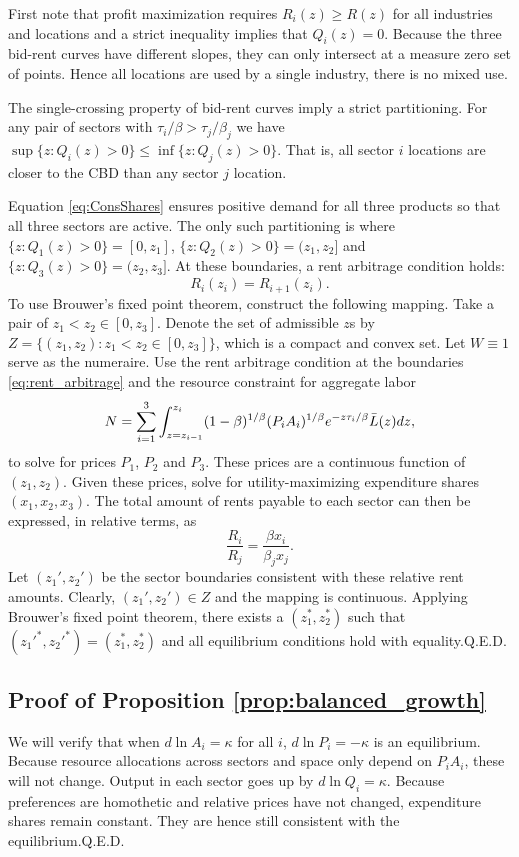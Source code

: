 \documentclass[12pt]{article}
\begin{document}
First note that profit maximization requires $R_i(z)\ge R(z)$ for all industries and locations and a strict inequality implies that $Q_i(z)=0$. Because the three bid-rent curves have different slopes, they can only intersect at a measure zero set of points. Hence all locations are used by a single industry, there is no mixed use.

The single-crossing property of bid-rent curves imply a strict partitioning. For any pair of sectors with $\tau_i/\beta>\tau_j/\beta_j$ we have $\sup\{z: Q_i(z)>0\} \le \inf\{z: Q_j(z)>0\}$. That is, all sector $i$ locations are closer to the CBD than any sector $j$ location.

Equation \eqref{eq:ConsShares} ensures positive demand for all three products so that all three sectors are active. The only such partitioning is where $\{z: Q_1(z)>0\} = [0,z_1]$, $\{z: Q_2(z)>0\} = (z_1,z_2]$ and $\{z: Q_3(z)>0\} = (z_2,z_3]$. At these boundaries, a rent arbitrage condition holds:
\begin{equation}\label{eq:rent_arbitrage}
	R_i(z_i) = R_{i+1}(z_i).
\end{equation}
To use Brouwer's fixed point theorem, construct the following mapping. Take a pair of $z_1<z_2 \in [0,z_3]$. Denote the set of admissible $z$s by $Z=\{(z_1,z_2): z_1<z_2 \in [0,z_3]\}$, which is a compact and convex set. Let $W\equiv 1$ serve as the numeraire. Use the rent arbitrage condition at the boundaries \eqref{eq:rent_arbitrage} and the resource constraint for aggregate labor
\[
N = \sum_{i=1}^3 \int_{z=z_{i-1}}^{z_i}(1-\beta)^{1/\beta}
	(P_iA_i)^{1/\beta}
	e^{- z \tau_i/\beta}\Bar L(z)dz,
\]
to solve for prices $P_1$, $P_2$ and $P_3$. These prices are a continuous function of $(z_1,z_2)$.
Given these prices, solve for utility-maximizing expenditure shares $(x_1,x_2,x_3)$. The total amount of rents payable to each sector can then be expressed, in relative terms, as
\[
\frac {R_i}
	{R_j}
=
\frac {\beta x_i}
	{\beta_j x_j}.
\]
Let $(z_1',z_2')$ be the sector boundaries consistent with these relative rent amounts. Clearly, $(z_1',z_2')\in Z$ and the mapping is continuous. Applying Brouwer's fixed point theorem, there exists a $(z_1^*,z_2^*)$ such that $(z_1'^{*},z_2'^{*}) = (z_1^*,z_2^*)$ and all equilibrium conditions hold with equality.\hfill Q.E.D.

\subsection{Proof of Proposition \ref{prop:balanced_growth}}
We will verify that when $d\ln A_i=\kappa$ for all $i$, $d\ln P_i=-\kappa$ is an equilibrium. Because resource allocations across sectors and space only depend on $P_iA_i$, these will not change. Output in each sector goes up by $d\ln Q_i = \kappa$. Because preferences are homothetic and relative prices have not changed, expenditure shares remain constant. They are hence still consistent with the equilibrium.\hfill Q.E.D.
\end{document}
